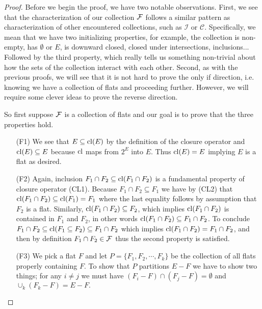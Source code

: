 \begin{proof}
Before we begin the proof, we have two notable observations. First, we see that the characterization of our collection $\mathcal{F}$ follows a similar pattern as characterization of other encountered collections, such as $\mathcal{I}$ or $\mathcal{C}$. Specifically, we mean that we have two initializing properties, for example, the collection is non-empty, has $\emptyset$ or $E$, is downward closed, closed under intersections, inclusions... Followed by the third property, which really tells us something non-trivial about how the sets of the collection interact with each other. 
Second, as with the previous proofs, we will see that it is not hard to prove the only if direction, i.e. knowing we have a collection of flats and proceeding further. However, we will require some clever ideas to prove the reverse direction.

So first suppose $\mathcal{F}$ is a collection of flats and our goal is to prove that the three properties hold. 

\begin{enumerate}
    \item[(F1)] We see that $E \subseteq \mathrm{cl}(E)$ by the definition of the closure operator and $\mathrm{cl}(E)\subseteq E$ because $\mathrm{cl}$ maps from $2^E$ into $E.$ Thus $\mathrm{cl}(E)= E$ implying $E$ is a flat as desired.
    
    \item[(F2)] Again, inclusion $F_1 \cap F_2 \subseteq \mathrm{cl}(F_1 \cap F_2)$ is a fundamental property of closure operator (CL1). Because $F_1 \cap F_2 \subseteq F_1$ we have by (CL2) that $\mathrm{cl}(F_1 \cap F_2) \subseteq \mathrm{cl}(F_1) = F_1$ where the last equality follows by assumption that $F_2$ is a flat. Similarly, $\mathrm{cl}(F_1\cap F_2) \subseteq F_2$, which implies $\mathrm{cl}(F_1\cap F_2)$ is contained in $F_1$ and $F_2$, in other words $\mathrm{cl}(F_1 \cap F_2) \subseteq F_1 \cap F_2$. To conclude $F_1 \cap F_2 \subseteq \mathrm{cl}(F_1 \subseteq F_2) \subseteq F_1 \cap F_2$ which implies $\mathrm{cl}(F_1 \cap F_2) = F_1 \cap F_2$, and then by definition $F_1 \cap F_2 \in \mathcal{F}$ thus the second property is satisfied.

    \item[(F3)] We pick a flat $F$ and let $P = \{F_1, F_2, \cdots, F_k\}$ be the collection of all flats properly containing $F$. To show that $P$ partitions $E - F$ we have to show two things; for any $i \neq j$ we must have $(F_i - F)\cap( F_j - F) = \emptyset$ and $\cup_{k}( F_k - F) = E - F.$ 
    

\end{enumerate}
\end{proof}
